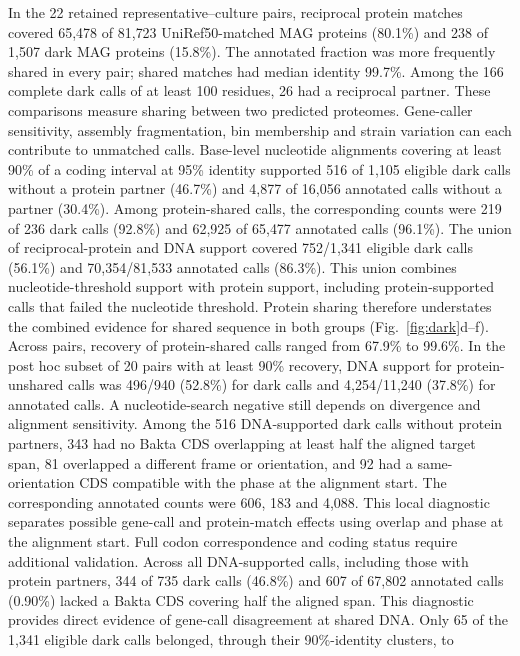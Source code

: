 \documentclass[11pt]{article}
\begin{document}
In the 22 retained representative--culture pairs, reciprocal protein matches covered 65{,}478
of 81{,}723 UniRef50-matched MAG proteins (80.1\%) and 238 of 1{,}507 dark MAG proteins (15.8\%).
The annotated fraction was more frequently shared in every pair; shared matches had median
identity 99.7\%. Among the 166 complete dark calls of at least 100 residues, 26 had a reciprocal
partner. These comparisons measure sharing between two predicted proteomes. Gene-caller
sensitivity, assembly fragmentation, bin membership and strain variation can each contribute to
unmatched calls. Base-level nucleotide alignments covering at least 90\% of a coding interval
at 95\% identity supported 516 of 1{,}105 eligible dark calls without a protein partner (46.7\%)
and 4{,}877 of 16{,}056 annotated calls without a partner (30.4\%). Among protein-shared calls,
the corresponding counts were 219 of 236 dark calls (92.8\%) and 62{,}925 of 65{,}477 annotated
calls (96.1\%). The union of reciprocal-protein and DNA support covered 752/1{,}341 eligible dark calls (56.1\%) and 70{,}354/81{,}533 annotated calls (86.3\%). This union combines nucleotide-threshold support with protein support, including protein-supported calls that failed the nucleotide threshold. Protein sharing therefore understates the combined evidence for shared sequence in both groups (Fig.~\ref{fig:dark}d--f). Across pairs, recovery of protein-shared calls ranged from 67.9\% to 99.6\%. In the post hoc subset of 20 pairs with at least 90\% recovery, DNA support for protein-unshared calls was 496/940 (52.8\%) for dark calls and 4{,}254/11{,}240 (37.8\%) for annotated calls.
A nucleotide-search negative still depends on divergence and alignment sensitivity.
Among the 516 DNA-supported dark calls without protein partners, 343 had no Bakta CDS
overlapping at least half the aligned target span, 81 overlapped a different frame or orientation,
and 92 had a same-orientation CDS compatible with the phase at the alignment start. The corresponding
annotated counts were 606, 183 and 4{,}088. This local diagnostic separates possible gene-call
and protein-match effects using overlap and phase at the alignment start. Full codon correspondence
and coding status require additional validation.
Across all DNA-supported calls, including those with protein partners, 344 of 735 dark calls
(46.8\%) and 607 of 67{,}802 annotated calls (0.90\%) lacked a Bakta CDS covering half the aligned
span. This diagnostic provides direct evidence of gene-call disagreement at shared DNA.
Only 65 of the 1{,}341 eligible dark calls belonged, through their 90\%-identity clusters, to
\end{document}
